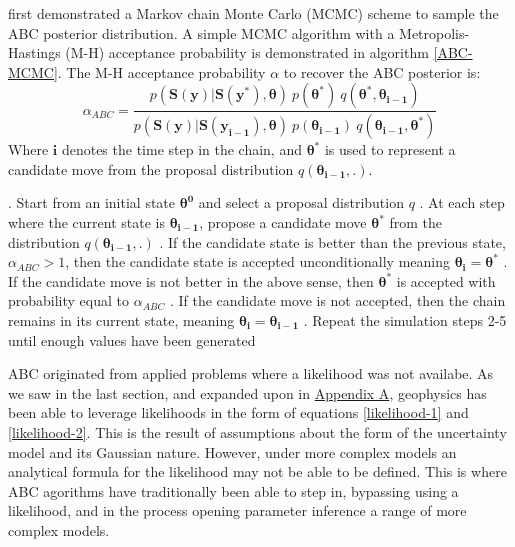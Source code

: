 \citet{Marjoram2003} first demonstrated a Markov chain Monte Carlo (MCMC) scheme to sample the ABC posterior distribution. A simple MCMC algorithm with a Metropolis-Hastings (M-H) acceptance probability is demonstrated in algorithm \ref{ABC-MCMC}. The M-H acceptance probability $\alpha$ to recover the ABC posterior is:
\begin{equation}
\alpha_{ABC} = \frac{p(\bm{S}(\bm{y})|\bm{S}(\bm{y^*}),\bm{\theta})\ p(\bm{\theta^*})\ q(\bm{\theta^*},\bm{\theta_{i-1}})} {p(\bm{S}(\bm{y})|\bm{S}(\bm{y_{i-1}}),\bm{\theta})\ p(\bm{\theta_{i-1}})\ q(\bm{\theta_{i-1}},\bm{\theta^*})}
\label{M-H-acce}
\end{equation}
Where $\bm{i}$ denotes the time step in the chain, and $\bm{\theta^*}$ is used to represent a candidate move from the proposal distribution $q(\bm{\theta_{i-1}}, . )$.

\begin{algorithm}[H]
	\caption{ }
	\begin{algorithmic}
		. Start from an initial state $\bm{\theta^0}$ and select a proposal distribution $q$
		. At each step where the current state is $\bm{\theta_{i-1}}$, propose a candidate 	move $\bm{\theta^*}$ from the distribution $q(\bm{\theta_{i-1}},.)$		
		. If the candidate state is better than the previous state, $\alpha_{ABC} > 1$, then the candidate state is accepted unconditionally meaning $\bm{\theta_i} = \bm{\theta^*}$
		. If the candidate move is not better in the above sense, then $\bm{\theta^*}$ is accepted with probability equal to $\alpha_{ABC}$		
		. If the candidate move is not accepted, then the chain remains in its current state, meaning $\bm{\theta_{i}} = \bm{\theta_{i-1}}$		
		. Repeat the simulation steps 2-5 until enough values have been generated
	\end{algorithmic}
	\label{ABC-MCMC}
\end{algorithm}

ABC originated from applied problems where a likelihood was not availabe. As we saw in the last section, and expanded upon in \hyperref[AppendixA]{Appendix A}, geophysics has been able to leverage likelihoods in the form of equations \ref{likelihood-1} and \ref{likelihood-2}. This is the result of assumptions about the form of the uncertainty model and its Gaussian nature. However, under more complex models an analytical formula for the likelihood may not be able to be defined. This is where ABC agorithms have traditionally been able to step in, bypassing using a likelihood, and in the process opening parameter inference a range of more complex models. \\

